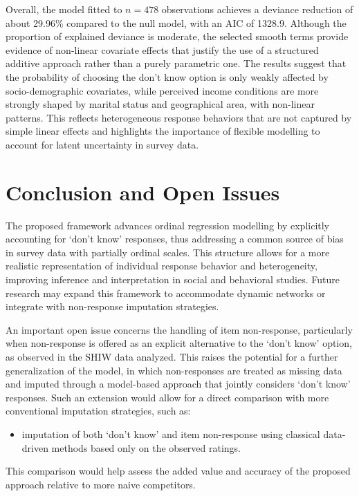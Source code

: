 \documentclass[submit]{smj}
\begin{document}
Overall, the model fitted to $n=478$ observations achieves a deviance reduction of about 
29.96\% compared to the null model, with an AIC of 1328.9. Although the proportion of 
explained deviance is moderate, the selected smooth terms provide evidence of non-linear 
covariate effects that justify the use of a structured additive approach rather than a 
purely parametric one. The results suggest that the probability of choosing 
the don't know option is only weakly affected by socio-demographic covariates, 
while perceived income conditions are more strongly shaped by marital status and geographical area, 
with non-linear patterns. This reflects heterogeneous response behaviors that are not 
captured by simple linear effects and highlights the importance of flexible modelling 
to account for latent uncertainty in survey data.

\section{Conclusion and Open Issues}

The proposed framework advances ordinal regression modelling by explicitly accounting for `don't know' responses, thus addressing a common source of bias in survey data with partially ordinal scales. This structure allows for a more realistic representation of individual response behavior and heterogeneity, improving inference and interpretation in social and behavioral studies. Future research may expand this framework to accommodate dynamic networks or integrate with non-response imputation strategies. 

An important open issue concerns the handling of item non-response, particularly when non-response is offered as an explicit alternative to the `don't know' option, as observed in the SHIW data analyzed. This raises the potential for a further generalization of the model, in which non-responses are treated as missing data and imputed through a model-based approach that jointly considers `don't know' responses. Such an extension would allow for a direct comparison with more conventional imputation strategies, such as:
\begin{itemize}
    \item imputation of both `don't know' and item non-response using classical data-driven methods based only on the observed ratings.
\end{itemize}
This comparison would help assess the added value and accuracy of the proposed approach relative to more naive competitors.
\end{document}
